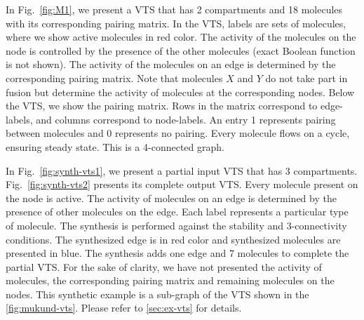 \begin{example}
%
In Fig.~\ref{fig:M1}, we present a VTS that has 2 compartments and 18 molecules with its corresponding pairing matrix.
%
%
In the VTS, labels are sets of molecules, where we show active molecules in red color.
%
The activity of the molecules on the node is controlled
by the presence of the other molecules (exact Boolean function is not shown). 
%
The activity of the molecules on an edge is determined by the corresponding pairing matrix.
%
Note that molecules $X$ and $Y$ do not take part in fusion but determine the activity of molecules at the corresponding nodes.
%
Below the VTS, we show the pairing matrix.
%
Rows in the matrix correspond to edge-labels, and columns correspond to node-labels.
%
An entry 1 represents pairing between molecules and 0 represents no pairing.
%
Every molecule flows on a cycle, ensuring steady state.
%
This is a 4-connected graph.
\end{example}

\begin{example}
	In Fig.~\ref{fig:synth-vts1}, we present a partial input VTS that has 3 compartments. Fig.~\ref{fig:synth-vts2} presents its complete output VTS. Every molecule present on the node is active. The activity of molecules on an edge is determined by the presence of other molecules on the edge. Each label represents a particular type of molecule. The synthesis is performed against the stability and 3-connectivity conditions. The synthesized edge is in red color and synthesized molecules are presented in blue. The synthesis adds one edge and 7 molecules to complete the partial VTS. For the sake of clarity, we have not presented the activity of molecules, the corresponding pairing matrix and remaining molecules on the nodes. This synthetic example is a sub-graph of the VTS shown in the \ref{fig:mukund-vts}. Please refer to \ref{sec:ex-vts} for details. 
\end{example}

%
\label{subsec:graphmodel}
%
%
%

